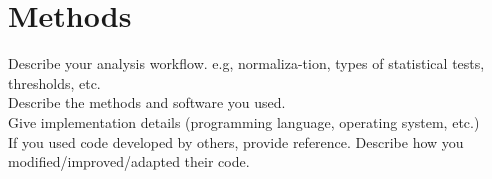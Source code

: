 
\section{Methods}

Describe your analysis workflow. e.g, normaliza-tion, types of statistical tests,
thresholds, etc. \\

Describe the methods and software you used. \\

Give implementation details (programming language, operating system, etc.) \\

If you used code developed by others, provide reference. Describe how you
modified/improved/adapted their code.
